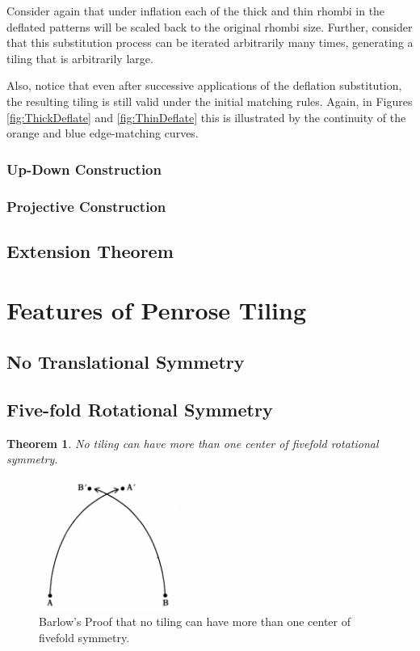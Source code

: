 \documentclass[]{article}
\newtheorem{mythm}{Theorem}
\begin{document}
Consider again that under inflation each of the thick and thin rhombi in the deflated patterns will be scaled back to the original rhombi size. Further, consider that this substitution process can be iterated arbitrarily many times, generating a tiling that is arbitrarily large. 

Also, notice that even after successive applications of the deflation substitution, the resulting tiling is still valid under the initial matching rules. Again, in Figures \ref{fig:ThickDeflate} and \ref{fig:ThinDeflate} this is illustrated by the continuity of the orange and blue edge-matching curves.

\subsubsection{Up-Down Construction}
\subsubsection{Projective Construction}
\subsection{Extension Theorem}

\section{Features of Penrose Tiling}
\subsection{No Translational Symmetry}
\subsection{Five-fold Rotational Symmetry}
\begin{mythm}
No tiling can have more than one center of fivefold rotational symmetry.
\label{symthm}
\end{mythm}

\begin{figure}[H]
	\centering
	\includegraphics[width=0.4\textwidth]{proof}
    \caption{Barlow's Proof that no tiling can have more than one center of fivefold symmetry.}
    \label{fig:fivefoldproof}
\end{figure}
\end{document}
